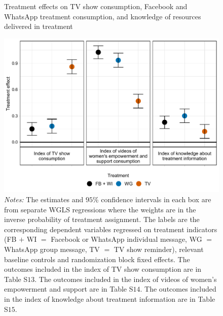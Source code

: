 \documentclass[12pt]{article}
\begin{document}
\begin{figure}[H]
    \centering
    \caption{Treatment effects on TV show consumption, Facebook and WhatsApp treatment consumption, and knowledge of resources delivered in treatment}
    \includegraphics[width=12cm, height=9cm\textwidth]{Figures/RF-FS/Figure2.pdf}
    \captionsetup{width=.75\linewidth}
    \caption*{\footnotesize \textit{Notes:} The estimates and $95$\% confidence intervals in each box are from separate WGLS regressions where the weights are in the inverse probability of treatment assignment. The labels are the corresponding dependent variables regressed on treatment indicators (FB $+$ WI $=$ Facebook or WhatsApp individual message, WG $=$ WhatsApp group message, TV $=$ TV show reminder), relevant baseline controls and randomization block fixed effects. The outcomes included in the index of TV show consumption are in Table S$13$. The outcomes included in the index of videos of women’s empowerment and support are in Table S$14$. The outcomes included in the index of knowledge about treatment information are in Table S$15$.}
\end{figure}
\end{document}
